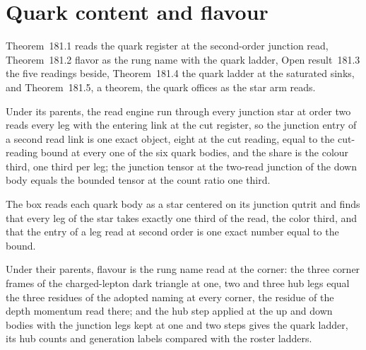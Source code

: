 \section{Quark content and flavour}\label{mod:VII-7-quark-content-and-flavour}
\label{narr:open:7-7}Theorem~181.1 reads the quark register at the second-order junction read, Theorem~181.2 flavor as the rung name with the quark ladder, Open result~181.3 the five readings beside, Theorem~181.4 the quark ladder at the saturated sinks, and Theorem~181.5, a theorem, the quark offices as the star arm reads.
\begin{chconditional}\label{box:VII-7-quark-content-and-flavour:1}
Under its parents, the read engine run through every junction star at order two reads every leg with the entering link at the cut register, so the junction entry of a second read link is one exact object, eight at the cut reading, equal to the cut-reading bound at every one of the six quark bodies, and the share is the colour third, one third per leg; the junction tensor at the two-read junction of the down body equals the bounded tensor at the count ratio one third.
\end{chconditional}
The box reads each quark body as a star centered on its junction qutrit and finds that every leg of the star takes exactly one third of the read, the color third, and that the entry of a leg read at second order is one exact number equal to the bound.
\begin{chconditional}\label{box:VII-7-quark-content-and-flavour:2}
Under their parents, flavour is the rung name read at the corner: the three corner frames of the charged-lepton dark triangle at one, two and three hub legs equal the three residues of the adopted naming at every corner, the residue of the depth momentum read there; and the hub step applied at the up and down bodies with the junction legs kept at one and two steps gives the quark ladder, its hub counts and generation labels compared with the roster ladders.
\end{chconditional}
